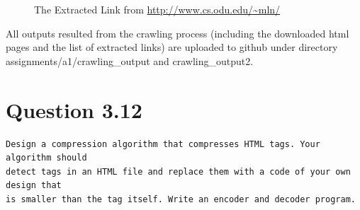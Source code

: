 \documentclass[letterpaper,11pt]{article}
\begin{document}
\begin{figure}[H]


\centering

\caption{The Extracted Link from \url{http://www.cs.odu.edu/~mln/}}

\label{fig:url}

\end{figure} 

All outputs resulted from the crawling process (including the downloaded html pages and the list of extracted links) are uploaded to github under directory assignments/a1/crawling\_output and crawling\_output2. 

\noindent\makebox[\linewidth]{\rule{\textwidth}{0.4pt}}

\section*{Question 3.12}
\begin{verbatim}
Design a compression algorithm that compresses HTML tags. Your algorithm should
detect tags in an HTML file and replace them with a code of your own design that
is smaller than the tag itself. Write an encoder and decoder program.
\end{verbatim}
\end{document}
